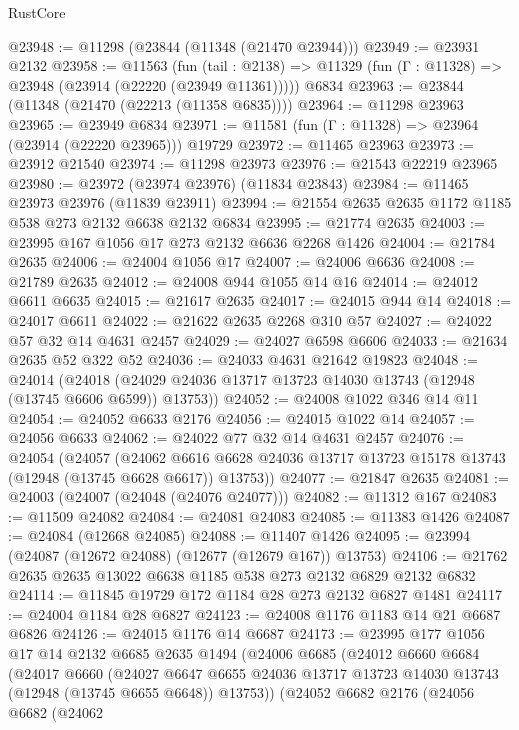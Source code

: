\begin{lexlean}{RustCore}
\begin{coremodule}
@23948 := @11298 (@23844 (@11348 (@21470 @23944)))
@23949 := @23931 @2132
@23958 := @11563
    (fun (tail : @2138) => @11329 (fun (Γ : @11328) => @23948 (@23914 (@22220 (@23949 @11361)))))
    @6834
@23963 := @23844 (@11348 (@21470 (@22213 (@11358 @6835))))
@23964 := @11298 @23963
@23965 := @23949 @6834
@23971 := @11581 (fun (Γ : @11328) => @23964 (@23914 (@22220 @23965))) @19729
@23972 := @11465 @23963
@23973 := @23912 @21540
@23974 := @11298 @23973
@23976 := @21543 @22219 @23965
@23980 := @23972 (@23974 @23976) (@11834 @23843)
@23984 := @11465 @23973 @23976 (@11839 @23911)
@23994 := @21554 @2635 @2635 @1172 @1185 @538 @273 @2132 @6638 @2132 @6834
@23995 := @21774 @2635
@24003 := @23995 @167 @1056 @17 @273 @2132 @6636 @2268 @1426
@24004 := @21784 @2635
@24006 := @24004 @1056 @17
@24007 := @24006 @6636
@24008 := @21789 @2635
@24012 := @24008 @944 @1055 @14 @16
@24014 := @24012 @6611 @6635
@24015 := @21617 @2635
@24017 := @24015 @944 @14
@24018 := @24017 @6611
@24022 := @21622 @2635 @2268 @310 @57
@24027 := @24022 @57 @32 @14 @4631 @2457
@24029 := @24027 @6598 @6606
@24033 := @21634 @2635 @52 @322 @52
@24036 := @24033 @4631 @21642 @19823
@24048 := @24014
    (@24018 (@24029 @24036 @13717 @13723 @14030 @13743 (@12948 (@13745 @6606 @6599)) @13753))
@24052 := @24008 @1022 @346 @14 @11
@24054 := @24052 @6633 @2176
@24056 := @24015 @1022 @14
@24057 := @24056 @6633
@24062 := @24022 @77 @32 @14 @4631 @2457
@24076 := @24054
    (@24057
      (@24062 @6616 @6628 @24036 @13717 @13723 @15178 @13743 (@12948 (@13745 @6628 @6617)) @13753))
@24077 := @21847 @2635
@24081 := @24003 (@24007 (@24048 (@24076 @24077)))
@24082 := @11312 @167
@24083 := @11509 @24082
@24084 := @24081 @24083
@24085 := @11383 @1426
@24087 := @24084 (@12668 @24085)
@24088 := @11407 @1426
@24095 := @23994 (@24087 (@12672 @24088) (@12677 (@12679 @167)) @13753)
@24106 := @21762 @2635 @2635 @13022 @6638 @1185 @538 @273 @2132 @6829 @2132 @6832
@24114 := @11845 @19729 @172 @1184 @28 @273 @2132 @6827 @1481
@24117 := @24004 @1184 @28 @6827
@24123 := @24008 @1176 @1183 @14 @21 @6687 @6826
@24126 := @24015 @1176 @14 @6687
@24173 := @23995
    @177
    @1056
    @17
    @14
    @2132
    @6685
    @2635
    @1494
    (@24006
      @6685
      (@24012
        @6660
        @6684
        (@24017
          @6660
          (@24027
            @6647
            @6655
            @24036
            @13717
            @13723
            @14030
            @13743
            (@12948 (@13745 @6655 @6648))
            @13753))
        (@24052
          @6682
          @2176
          (@24056
            @6682
            (@24062

\end{coremodule}
\end{lexlean}
